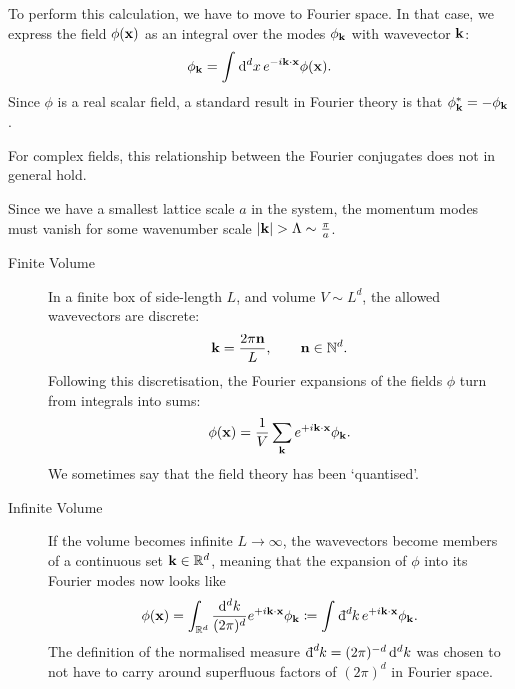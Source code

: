 To perform this calculation, we have to move to Fourier space.
In that case, we express the field $\phi(\vb{x})$ as an integral over the modes $\phi_{\vb{k}}$ with wavevector $\vb{k}$:
\begin{equation}
  \phi_{\vb{k}} = \int_{}^{} \dd[d]{x} e^{-i \vb{k} \cdot \vb{x}} \phi(\vb{x}).
\end{equation}
Since $\phi$ is a real scalar field, a standard result in Fourier theory is that $\phi_{\vb{k}}^* = -\phi_{\vb{k}}$.
\begin{leftbar}
  \begin{remark}
    For complex fields, this relationship between the Fourier conjugates does not in general hold.
  \end{remark}
\end{leftbar}
Since we have a smallest lattice scale $a$ in the system, the momentum modes must vanish for some wavenumber scale $ \abs{\vb{k}} > \Lambda \sim \frac{\pi}{a}$.

\begin{description}
  \item[Finite Volume] 
    In a finite box of side-length $L$, and volume $V \sim L^d$, the allowed wavevectors are discrete:
    \begin{equation}
      \vb{k} = \frac{2 \pi \vb{n}}{L}, \qquad \vb{n} \in \mathbb{N}^d.
    \end{equation}
    Following this discretisation, the Fourier expansions of the fields $\phi$ turn from integrals into sums:
    \begin{equation}
      \phi(\vb{x}) = \frac{1}{V} \sum_{\vb{k}} e^{+i \vb{k} \cdot \vb{x}} \phi_{\vb{k}}.
    \end{equation}
    We sometimes say that the field theory has been `quantised'.
  \item[Infinite Volume] If the volume becomes infinite $L \to \infty$, the wavevectors become members of a continuous set $\vb{k} \in \mathbb{R}^d$, meaning that the expansion of $\phi$ into its Fourier modes now looks like
    \begin{equation}
      \phi(\vb{x}) = \int_{\mathbb{R}^d}^{} \frac{\dd[d]{k}}{(2\pi)^d} e^{+i \vb{k} \cdot \vb{x}} \phi_{\vb{k}} \coloneqq \int_{}^{} \bdd[d]{k} e^{+i \vb{k} \cdot \vb{x}} \phi_{\vb{k}}.
    \end{equation}
    The definition of the normalised measure $\bdd[d]{k} = (2\pi)^{-d} \dd[d]{k}$ was chosen to not have to carry around superfluous factors of $(2\pi)^d$ in Fourier space.
\end{description}


